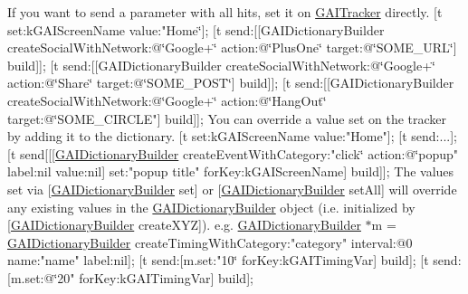  If you want to send a parameter with all hits, set it on \hyperlink{protocol_g_a_i_tracker-p}{G\+A\+I\+Tracker} directly. {\ttfamily  \mbox{[}t set\+:k\+G\+A\+I\+Screen\+Name value\+:"Home\char`\"{}\mbox{]};
\mbox{[}t send\+:\mbox{[}\mbox{[}\+G\+A\+I\+Dictionary\+Builder create\+Social\+With\+Network\+:@\char`\"{}Google+\char`\"{}
                                                action\+:@\char`\"{}Plus\+One\char`\"{}
                                                target\+:@\char`\"{}S\+O\+M\+E\+\_\+\+U\+RL\char`\"{}\mbox{]} build\mbox{]}\mbox{]};
\mbox{[}t send\+:\mbox{[}\mbox{[}\+G\+A\+I\+Dictionary\+Builder create\+Social\+With\+Network\+:@\char`\"{}Google+\char`\"{}
                                                action\+:@\char`\"{}Share\char`\"{}
                                                target\+:@\char`\"{}S\+O\+M\+E\+\_\+\+P\+O\+ST\char`\"{}\mbox{]} build\mbox{]}\mbox{]};
\mbox{[}t send\+:\mbox{[}\mbox{[}\+G\+A\+I\+Dictionary\+Builder create\+Social\+With\+Network\+:@\char`\"{}Google+\char`\"{}
                                                action\+:@\char`\"{}Hang\+Out\char`\"{}
                                                target\+:@\char`\"{}S\+O\+M\+E\+\_\+\+C\+I\+R\+C\+LE"\mbox{]} build\mbox{]}\mbox{]}; } You can override a value set on the tracker by adding it to the dictionary. {\ttfamily  \mbox{[}t set\+:k\+G\+A\+I\+Screen\+Name value\+:"Home"\mbox{]}; \mbox{[}t send\+:...\mbox{]}; \mbox{[}t send\mbox{[}\mbox{[}\mbox{[}\hyperlink{interface_g_a_i_dictionary_builder}{G\+A\+I\+Dictionary\+Builder} create\+Event\+With\+Category\+:"click\char`\"{}
                                                action\+:@\char`\"{}popup" label\+:nil value\+:nil\mbox{]} set\+:"popup title" for\+Key\+:k\+G\+A\+I\+Screen\+Name\mbox{]} build\mbox{]}\mbox{]}; } The values set via \mbox{[}\hyperlink{interface_g_a_i_dictionary_builder}{G\+A\+I\+Dictionary\+Builder} set\mbox{]} or \mbox{[}\hyperlink{interface_g_a_i_dictionary_builder}{G\+A\+I\+Dictionary\+Builder} set\+All\mbox{]} will override any existing values in the \hyperlink{interface_g_a_i_dictionary_builder}{G\+A\+I\+Dictionary\+Builder} object (i.\+e. initialized by \mbox{[}\hyperlink{interface_g_a_i_dictionary_builder}{G\+A\+I\+Dictionary\+Builder} create\+X\+YZ\mbox{]}). e.\+g. {\ttfamily  \hyperlink{interface_g_a_i_dictionary_builder}{G\+A\+I\+Dictionary\+Builder} $\ast$m = \hyperlink{interface_g_a_i_dictionary_builder}{G\+A\+I\+Dictionary\+Builder} create\+Timing\+With\+Category\+:"category" interval\+:@0 name\+:"name" label\+:nil\mbox{]}; \mbox{[}t send\+:\mbox{[}m.\+set\+:"10\char`\"{} for\+Key\+:k\+G\+A\+I\+Timing\+Var\mbox{]} build\mbox{]};
\mbox{[}t send\+:\mbox{[}m.\+set\+:@\char`\"{}20" for\+Key\+:k\+G\+A\+I\+Timing\+Var\mbox{]} build\mbox{]}; } 

